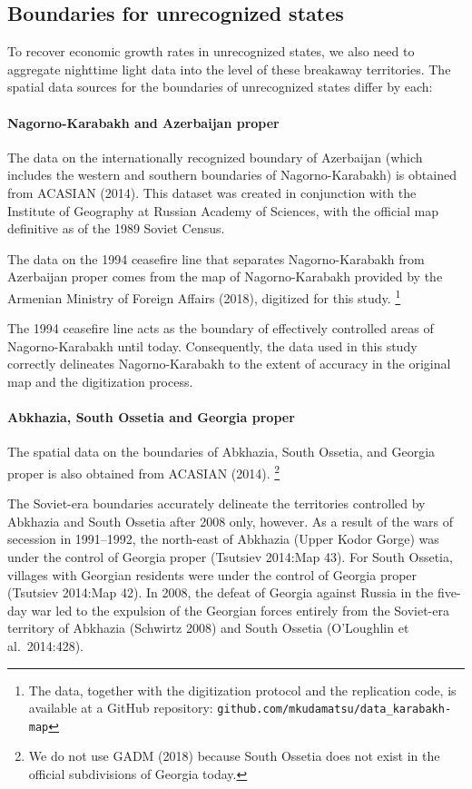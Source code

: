 \documentclass[12pt,a4paper]{article}%
\begin{document}
\subsection{Boundaries for unrecognized states}
To recover economic growth rates in unrecognized states, we also need to aggregate nighttime light data into the level of these breakaway territories. The spatial data sources for the boundaries of unrecognized states differ by each:
\paragraph{Nagorno-Karabakh and Azerbaijan proper}
The data on the internationally recognized boundary of Azerbaijan (which includes the western and southern boundaries of Nagorno-Karabakh) is obtained from ACASIAN (2014). This dataset was created in conjunction with the Institute of Geography at Russian Academy of Sciences, with the official map definitive as of the 1989 Soviet Census. 

The data on the 1994 ceasefire line that separates Nagorno-Karabakh from Azerbaijan proper comes from the map of Nagorno-Karabakh provided by the Armenian Ministry of Foreign Affairs (2018), digitized for this study.%
\footnote{
	The data, together with the digitization protocol and the replication code, is available at a GitHub repository: \verb!github.com/mkudamatsu/data_karabakh-map!
}

The 1994 ceasefire line acts as the boundary of effectively controlled areas of Nagorno-Karabakh until today. Consequently, the data used in this study correctly delineates Nagorno-Karabakh to the extent of accuracy in the original map and the digitization process.

\paragraph{Abkhazia, South Ossetia and Georgia proper}  
The spatial data on the boundaries of Abkhazia, South Ossetia, and Georgia proper is also obtained from ACASIAN (2014).%
\footnote{
	We do not use GADM (2018) because South Ossetia does not exist in the official subdivisions of Georgia today.
	} 


The Soviet-era boundaries accurately delineate the territories controlled by Abkhazia and South Ossetia after 2008 only, however. As a result of the wars of secession in 1991--1992, the north-east of Abkhazia (Upper Kodor Gorge) was under the control of Georgia proper (Tsutsiev 2014:Map 43). 
For South Ossetia, villages with Georgian residents were under the control of Georgia proper (Tsutsiev 2014:Map 42). 
In 2008, the defeat of Georgia against Russia in the five-day war led to the expulsion of the Georgian forces entirely from the Soviet-era territory of Abkhazia (Schwirtz 2008) and South Ossetia (O'Loughlin et al.\ 2014:428).  
\end{document}
